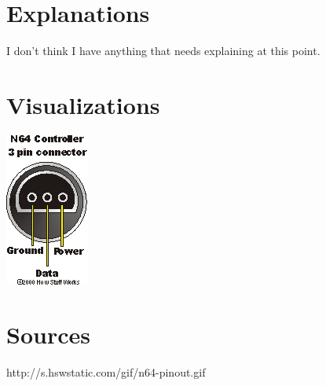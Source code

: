 \documentclass{article}
\begin{document}
	\section{Explanations}
	I don't think I have anything that needs explaining at this point. 
	
	\section{Visualizations}
	\includegraphics{n64pinout.png}
	
	\section{Sources} 
	http://s.hswstatic.com/gif/n64-pinout.gif
	
	
\end{document}
